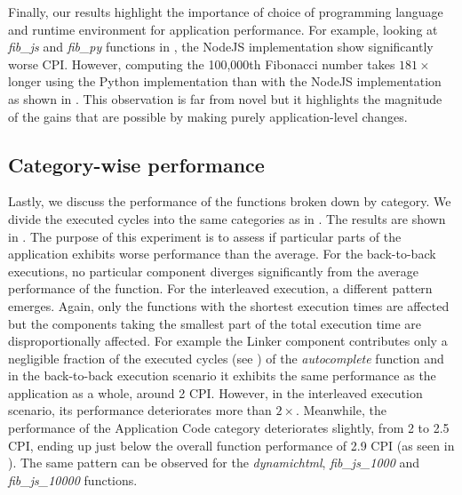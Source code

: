 Finally, our results highlight the importance of choice of programming language and runtime environment for application performance.  For example, looking at \emph{fib\_js} and \emph{fib\_py} functions in , the NodeJS implementation show significantly worse CPI. However, computing the 100,000th Fibonacci number takes $181\times$ longer using the Python implementation than with the NodeJS implementation as shown in . This observation is far from novel but it highlights the magnitude of the gains that are possible by making purely application-level changes.


\subsection{Category-wise performance}
\label{wosc:subsec:cat-perf}



Lastly, we discuss the performance of the functions broken down by category. We divide the executed cycles into the same categories as in . The results are shown in . The purpose of this experiment is to assess if particular parts of the application exhibits worse performance than the average. For the back-to-back executions, no particular component diverges significantly from the average performance of the function. For the interleaved execution, a different pattern emerges. Again, only the functions with the shortest execution times are affected but the components taking the smallest part of the total execution time are disproportionally affected. For example the Linker component contributes only a negligible fraction of the executed cycles (see ) of the \emph{autocomplete} function and in the back-to-back execution scenario it exhibits the same performance as the application as a whole, around 2 CPI. However, in the interleaved execution scenario, its performance deteriorates more than $2 \times$.
Meanwhile, the performance of the Application Code category deteriorates slightly, from 2 to 2.5 CPI, ending up just below the overall function performance of 2.9 CPI (as seen in ). The same pattern can be observed for the \emph{dynamichtml}, \emph{fib\_js\_1000} and \emph{fib\_js\_10000}
functions.


